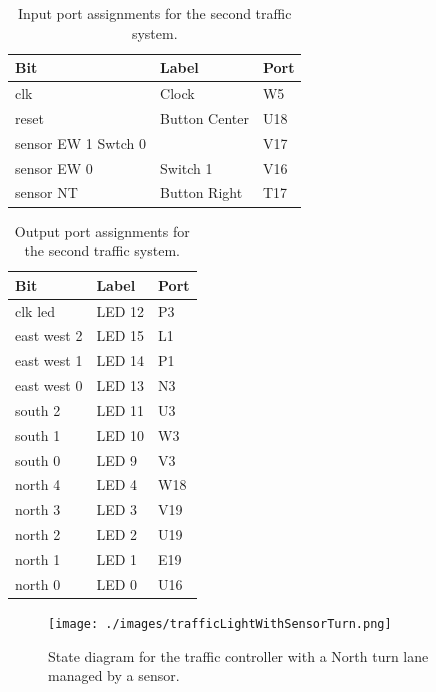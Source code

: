 \documentclass[11pt]{article}
\begin{document}
\begin{table}[H]
\begin{center}
\begin{tabular}{| l | l | l |}
	\hline
	Bit & Label & Port \\ \hline
	clk &  Clock & W5 \\ \hline
	reset & Button Center & U18 \\ \hline
	sensor EW 1 Swtch 0 & & V17 \\ \hline
	sensor EW 0 & Switch 1 & V16 \\ \hline
	sensor NT & Button Right& T17 \\ \hline
\end{tabular}
\caption{\label{tab:part2_input_Ports}Input port assignments for  the second traffic system.}
\end{center}
\end{table}

\begin{table}[H]
\begin{center}
\begin{tabular}{| l | l | l |}
	\hline
	Bit & Label & Port \\ \hline
	clk led & LED 12 & P3 \\ \hline
	east west 2 & LED 15 & L1 \\ \hline
	east west 1 & LED 14 & P1 \\ \hline
	east west 0 & LED 13 & N3 \\ \hline
	south 2 & LED 11 & U3 \\ \hline
	south 1 & LED 10 & W3 \\ \hline
	south 0 & LED 9 & V3 \\ \hline
	north 4 & LED 4 & W18 \\ \hline
	north 3 & LED 3 & V19 \\ \hline
	north 2 & LED 2 & U19 \\ \hline
	north 1 & LED 1 & E19 \\ \hline
	north 0 & LED 0 & U16 \\ \hline
\end{tabular}
\caption{\label{tab:part2_output_Ports}Output port assignments for the second traffic system.}
\end{center}
\end{table}

\begin{figure}
\begin{center}
	\texttt{[image: ./images/trafficLightWithSensorTurn.png]}
	\caption{\label{fig:part2_state_diagram}State diagram for the traffic controller with a North turn lane managed by a sensor.}
\end{center}
\end{figure}
\end{document}
